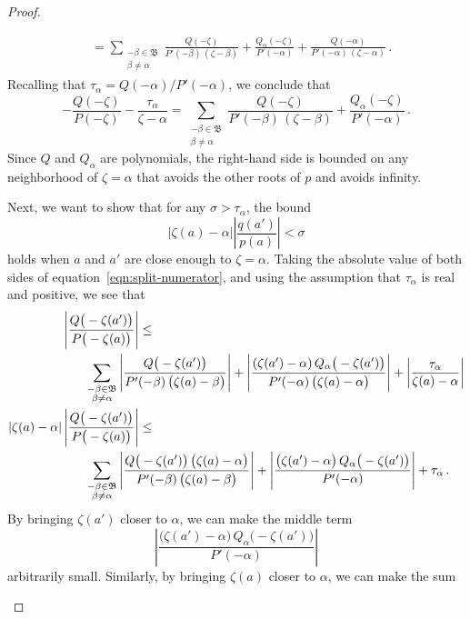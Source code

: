 \documentclass[final]{siamart220329}
\newcommand{\roots}{\mathfrak{B}}
\begin{document}
\begin{proof}
\begin{itemize}
\begin{align*}
&=\sum_{\substack{-\beta \in \roots \\ \beta \neq \alpha}} \frac{Q(-\zeta)}{P'(-\beta)\,(\zeta - \beta)} + \frac{Q_\alpha(-\zeta)}{P'(-\alpha)} + \frac{Q(-\alpha)}{P'(-\alpha)\,(\zeta - \alpha)}\,.
\end{align*}
Recalling that $\tau_\alpha = Q(-\alpha)/P'(-\alpha)$, we conclude that
\[-\frac{Q(-\zeta)}{P(-\zeta)}-\frac{\tau_\alpha}{\zeta-\alpha}=\sum_{\substack{-\beta \in \roots \\ \beta \neq \alpha}} \frac{Q(-\zeta)}{P'(-\beta)\,(\zeta - \beta)} + \frac{Q_\alpha(-\zeta)}{P'(-\alpha)}\,. \]
Since $Q$ and $Q_\alpha$ are polynomials, the right-hand side is bounded on any neighborhood of $\zeta = \alpha$ that avoids the other roots of $p$ and avoids infinity.

Next, we want to show that for any $\sigma > \tau_\alpha$, the bound
\[ |\zeta(a) - \alpha| \left|\frac{q(a')}{p(a)}\right| < \sigma \]
holds when $a$ and $a'$ are close enough to $\zeta = \alpha$. Taking the absolute value of both sides of equation~\eqref{eqn:split-numerator}, and using the assumption that $\tau_\alpha$ is real and positive, we see that
\begin{align*}
\left|\frac{Q\big(-\zeta(a')\big)}{P\big(-\zeta(a)\big)}\right| & \le \\ & \hspace{-15mm} \sum_{\substack{-\beta \in \roots \\ \beta \neq \alpha}} \left|\frac{Q\big(-\zeta(a')\big)}{P'(-\beta)\,\big(\zeta(a) - \beta\big)}\right| + \left|\frac{(\zeta(a') - \alpha)\,Q_\alpha\big(-\zeta(a')\big)}{P'(-\alpha)\,\big(\zeta(a) - \alpha\big)}\right| + \left|\frac{\tau_\alpha}{\zeta(a) - \alpha}\right| \\
|\zeta(a) - \alpha|\left|\frac{Q\big(-\zeta(a')\big)}{P\big(-\zeta(a)\big)}\right| & \le \\
& \hspace{-15mm} \sum_{\substack{-\beta \in \roots \\ \beta \neq \alpha}} \left|\frac{Q\big(-\zeta(a')\big)\,\big(\zeta(a) - \alpha\big)}{P'(-\beta)\,\big(\zeta(a) - \beta\big)}\right| + \left|\frac{\big(\zeta(a') - \alpha\big)\,Q_\alpha\big(-\zeta(a')\big)}{P'(-\alpha)}\right| + \tau_\alpha\,.
\end{align*}
By bringing $\zeta(a')$ closer to $\alpha$, we can make the middle term
\[\left|\frac{\big(\zeta(a') - \alpha\big)\,Q_\alpha\big(-\zeta(a')\big)}{P'(-\alpha)}\right|\]
arbitrarily small. Similarly, by bringing $\zeta(a)$ closer to $\alpha$, we can make the sum

\end{itemize}
\end{proof}
\end{document}
